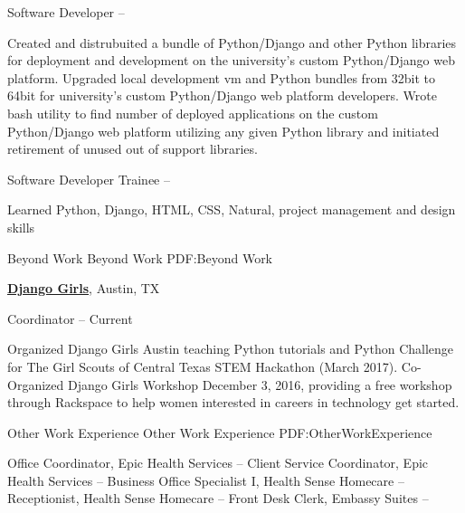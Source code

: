 \documentclass[letterpaper,MMMyyyy,nonstopmode]{simpleresumecv}
\begin{document}
\begin{Body}
\Gap
\BulletItem
Software Developer 
\hfill
{} --
\begin{Detail}
\SubBulletItem
Created and distrubuited a bundle of Python/Django and other Python libraries for deployment and development on the university's custom Python/Django web platform.
\SubBulletItem
Upgraded local development vm and Python bundles from 32bit to 64bit for university's custom Python/Django web platform developers.
\SubBulletItem
Wrote bash utility to find number of deployed applications on the custom Python/Django web platform utilizing any given Python library and initiated retirement of unused out of support libraries.
\end{Detail}

\Gap
\BulletItem
Software Developer Trainee
\hfill
{} --
\begin{Detail}
\SubBulletItem
Learned Python, Django, HTML, CSS, Natural, project management and design skills
\end{Detail}



\Section
{Beyond Work}
{Beyond Work}
{PDF:Beyond Work}

\Entry
\href{https://djangogirls.org/austin/}
{\textbf{Django Girls}},
Austin, TX

\Gap
\BulletItem
Coordinator
\hfill
{} --
Current
\begin{Detail}
\SubBulletItem
Organized Django Girls Austin teaching Python tutorials and Python Challenge for The Girl Scouts of Central Texas STEM Hackathon (March 2017). 
\SubBulletItem
\href{https://www.gitbook.com/book/megwill4268/learning-python-on-mars/details}{}
\SubBulletItem
Co-Organized Django Girls Workshop December 3, 2016, providing a free workshop through Rackspace to help women interested in careers in technology get started.
\end{Detail}



\Section
{Other Work\newline
Experience}
{Other Work Experience}
{PDF:OtherWorkExperience}

\Gap
\BulletItem
Office Coordinator, Epic Health Services 
\hfill
{} --
\BulletItem
Client Service Coordinator, Epic Health Services 
\hfill
{} --
\BulletItem
Business Office Specialist I, Health Sense Homecare 
\hfill
{} --
\BulletItem
Receptionist, Health Sense Homecare
\hfill
{} --
\BulletItem
Front Desk Clerk, Embassy Suites
\hfill
{} --




\end{Body}
\end{document}
